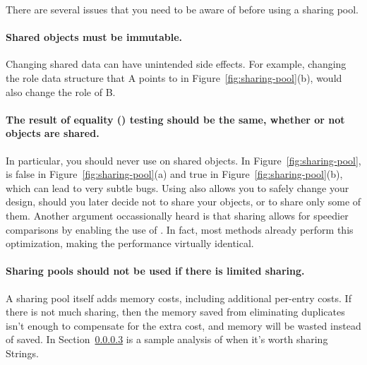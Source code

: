 There are several issues that you need to be aware of before using a sharing
pool.
\paragraph{Shared objects must be immutable.} Changing shared data can
have unintended side effects. For example, 
changing the role data structure that A points to in
Figure~\ref{fig:sharing-pool}(b), would also change the role of B.

\paragraph{The result of equality () testing should be the same,
whether or not objects are shared.}
 In particular, you should never use \code{==} on shared objects.
In Figure~\ref{fig:sharing-pool},  is false in
Figure~\ref{fig:sharing-pool}(a) and true in Figure~\ref{fig:sharing-pool}(b),
 which can lead to very subtle bugs. Using  also allows you to
 safely change your design, should you later decide not to share your objects,
 or to share only some of them.  Another argument occassionally heard is that
 sharing allows for speedier comparisons by enabling the use of \code{==}.  In
fact, most  methods already perform this
optimization, making the performance virtually identical.
 
\paragraph{Sharing pools should not be used if there is limited sharing.}
A sharing pool itself adds
memory costs, including additional per-entry costs. If there is not
much sharing, then the memory saved from
eliminating duplicates isn't enough to compensate for the
extra cost, and memory will be wasted instead of saved.  In Section~\ref{} is
a sample analysis of when it's worth sharing Strings.


